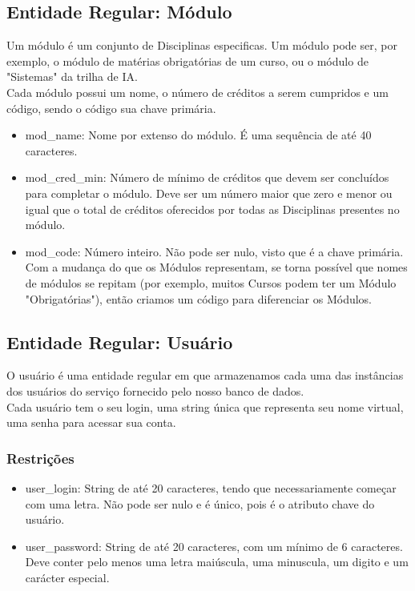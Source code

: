 \documentclass{article}
\begin{document}
  	\subsection{Entidade Regular: Módulo}
  	    \quad Um módulo é um conjunto de Disciplinas especificas. Um módulo pode ser, por exemplo, o módulo de matérias obrigatórias de um curso, ou o módulo de "Sistemas" da trilha de IA. \\
  	    \null \quad Cada módulo possui um nome, o número de créditos a serem cumpridos e um código, sendo o código sua chave primária.
  	    \begin{itemize}
  	            \item mod\_name: Nome por extenso do módulo. É uma sequência de até 40 caracteres.
  	            \item mod\_cred\_min: Número de mínimo de créditos que devem ser concluídos para completar o módulo. Deve ser um número maior que zero e menor ou igual que o total de créditos oferecidos por todas as Disciplinas presentes no módulo.
  	            \item mod\_code: Número inteiro. Não pode ser nulo, visto que é a chave primária. Com a mudança do que os Módulos representam, se torna possível que nomes de módulos se repitam (por exemplo, muitos Cursos podem ter um Módulo "Obrigatórias"), então criamos um código para diferenciar os Módulos.
  		    \end{itemize}
  		    
  	\subsection{Entidade Regular: Usuário}
  	    \quad O usuário é uma entidade regular em que armazenamos cada uma das instâncias dos usuários do serviço fornecido pelo nosso banco de dados. \\
  	    \null \quad Cada usuário tem o seu login, uma string única que representa seu nome virtual, uma senha para acessar sua conta.
  	    \subsubsection{Restrições}
  	        \begin{itemize}
  	            \item user\_login: String de até 20 caracteres, tendo que necessariamente começar com uma letra. Não pode ser nulo e é único, pois é o atributo chave do usuário.
  	            \item user\_password: String de até 20 caracteres, com um mínimo de 6 caracteres. Deve conter pelo menos uma letra maiúscula, uma minuscula, um digito e um carácter especial.
  	        \end{itemize}
  	        
\end{document}

